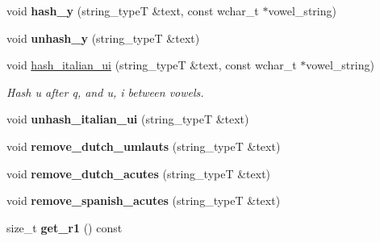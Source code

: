 \begin{DoxyCompactItemize}
\item 
\hypertarget{group___stemming_gab7cc895f7a16b9bec4a4c4614111ecb3}{void {\bfseries hash\-\_\-y} (string\-\_\-type\-T \&text, const wchar\-\_\-t $\ast$vowel\-\_\-string)}\label{group___stemming_gab7cc895f7a16b9bec4a4c4614111ecb3}

\item 
\hypertarget{group___stemming_gacc93df08d3d68d2468aa3e7cf23c7089}{void {\bfseries unhash\-\_\-y} (string\-\_\-type\-T \&text)}\label{group___stemming_gacc93df08d3d68d2468aa3e7cf23c7089}

\item 
\hypertarget{group___stemming_ga11d05105fc3e03bd5f2ff581bc4eb6fe}{void \hyperlink{group___stemming_ga11d05105fc3e03bd5f2ff581bc4eb6fe}{hash\-\_\-italian\-\_\-ui} (string\-\_\-type\-T \&text, const wchar\-\_\-t $\ast$vowel\-\_\-string)}\label{group___stemming_ga11d05105fc3e03bd5f2ff581bc4eb6fe}

\begin{DoxyCompactList}\small\item\em Hash u after q, and u, i between vowels. \end{DoxyCompactList}\item 
\hypertarget{group___stemming_gab4f2f7360665b96d941ba614dc3d5092}{void {\bfseries unhash\-\_\-italian\-\_\-ui} (string\-\_\-type\-T \&text)}\label{group___stemming_gab4f2f7360665b96d941ba614dc3d5092}

\item 
\hypertarget{group___stemming_ga44d995c39f2a31089ae3505fb483cbfa}{void {\bfseries remove\-\_\-dutch\-\_\-umlauts} (string\-\_\-type\-T \&text)}\label{group___stemming_ga44d995c39f2a31089ae3505fb483cbfa}

\item 
\hypertarget{group___stemming_ga42ba7697636adbf2d757c360a981920f}{void {\bfseries remove\-\_\-dutch\-\_\-acutes} (string\-\_\-type\-T \&text)}\label{group___stemming_ga42ba7697636adbf2d757c360a981920f}

\item 
\hypertarget{group___stemming_ga0b3535733088736897f35f8d925c92e9}{void {\bfseries remove\-\_\-spanish\-\_\-acutes} (string\-\_\-type\-T \&text)}\label{group___stemming_ga0b3535733088736897f35f8d925c92e9}

\item 
\hypertarget{group___stemming_ga09ab497dfe31fc007c70d7f7d790fa51}{size\-\_\-t {\bfseries get\-\_\-r1} () const }\label{group___stemming_ga09ab497dfe31fc007c70d7f7d790fa51}


\end{DoxyCompactItemize}
